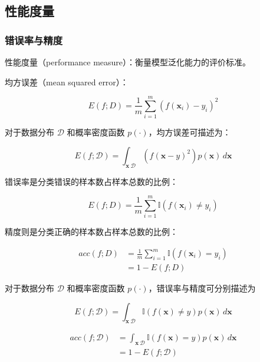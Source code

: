 \documentclass[../studies-ml.tex]{subfiles}
\begin{document}
\subsection{性能度量}

\subsubsection{错误率与精度}

性能度量（performance measure）：衡量模型泛化能力的评价标准。

均方误差（mean squared error）：

\begin{equation}
  E(f; D) = \frac{1}{m} \sum_{i=1}^{m} (f(\pmb{x}_i) - y_i)^2
\end{equation}

对于数据分布 $\mathcal{D}$ 和概率密度函数 $p(\cdot)$，均方误差可描述为：

\begin{equation}
  E(f; \mathcal{D}) = \int_{\pmb{x}~\mathcal{D}} (f(\pmb{x} - y)^2) p(\pmb{x}) \,d\pmb{x}
\end{equation}

错误率是分类错误的样本数占样本总数的比例：

\begin{equation}
  E(f; D) = \frac{1}{m} \sum_{i=1}^{m} \mathbb{I} (f(\pmb{x}_i) \ne y_i)
\end{equation}

精度则是分类正确的样本数占样本总数的比例：

\begin{equation}
  \begin{split}
    acc(f; D) & = \frac{1}{m} \sum_{i=1}^{m} \mathbb{I} (f(\pmb{x}_i) = y_i) \\
    & = 1 - E(f; D)
  \end{split}
\end{equation}

对于数据分布 $\mathcal{D}$ 和概率密度函数 $p(\cdot)$，错误率与精度可分别描述为

\begin{equation}
  E(f; \mathcal{D}) = \int_{\pmb{x}~\mathcal{D}} \mathbb{I} (f(\pmb{x}) \ne y) p(\pmb{x}) \, d\pmb{x}
\end{equation}

\begin{equation}
  \begin{split}
    acc(f; \mathcal{D}) & = \int_{\pmb{x}~\mathcal{D}} \mathbb{I} (f(\pmb{x}) = y) p(\pmb{x}) \, d\pmb{x} \\
    & = 1 - E(f; \mathcal{D})
  \end{split}
\end{equation}
\end{document}
